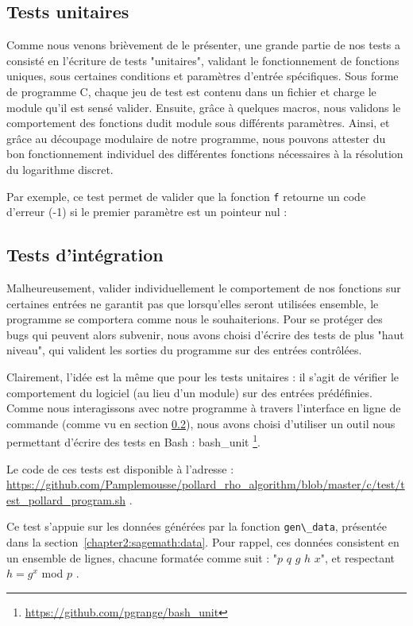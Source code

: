       \subsection{Tests unitaires}
      Comme nous venons brièvement de le présenter, une grande partie de nos tests a consisté en l'écriture de tests "unitaires", validant le fonctionnement de fonctions uniques, sous certaines conditions et paramètres d'entrée spécifiques.
      Sous forme de programme C, chaque jeu de test est contenu dans un fichier et charge le module qu'il est sensé valider. Ensuite, grâce à quelques macros, nous validons le comportement des fonctions dudit module sous différents paramètres.
      Ainsi, et grâce au découpage modulaire de notre programme, nous pouvons attester du bon fonctionnement individuel des différentes fonctions nécessaires à la résolution du logarithme discret.

      Par exemple, ce test permet de valider que la fonction \lstinline{f} retourne un code d'erreur (-1) si le premier paramètre est un pointeur nul :

      


      \subsection{Tests d'intégration}
      Malheureusement, valider individuellement le comportement de nos fonctions sur certaines entrées ne garantit pas que lorsqu'elles seront utilisées ensemble, le programme se comportera comme nous le souhaiterions.
      Pour se protéger des bugs qui peuvent alors subvenir, nous avons choisi d'écrire des tests de plus "haut niveau", qui valident les sorties du programme sur des entrées contrôlées.

      Clairement, l'idée est la même que pour les tests unitaires : il s'agit de vérifier le comportement du logiciel (au lieu d'un module) sur des entrées prédéfinies. Comme nous interagissons avec notre programme à travers l'interface en ligne de commande (comme vu en section \ref{}), nous avons choisi d'utiliser un outil nous permettant d'écrire des tests en Bash : bash\_unit \footnote{\url{https://github.com/pgrange/bash_unit}}.

      Le code de ces tests est disponible à l'adresse : \url{https://github.com/Pamplemousse/pollard_rho_algorithm/blob/master/c/test/test_pollard_program.sh} .

      Ce test s'appuie sur les données générées par la fonction \lstinline{gen\_data}, présentée dans la section~\ref{chapter2:sagemath:data}. Pour rappel, ces données consistent en un ensemble de lignes, chacune formatée comme suit : "$p$ $q$ $g$ $h$ $x$", et respectant $h = g^x$ mod $p$ .

